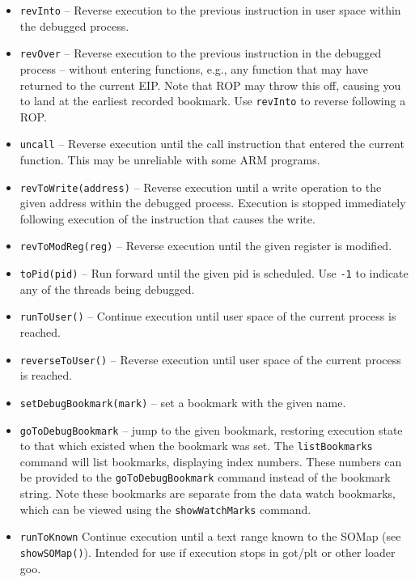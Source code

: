 \documentclass[titlepage]{article}
\begin{document}
\begin{itemize}
\item {\tt revInto} – Reverse execution to the previous instruction in user space within the debugged process. 

\item {\tt revOver} – Reverse execution to the previous instruction in the debugged process – without entering functions, e.g., any function that may have returned to the current EIP.  Note that ROP may throw this off, causing you to land at the earliest recorded bookmark.  Use {\tt revInto} to reverse following a ROP.

\item {\tt uncall} – Reverse execution until the call instruction that entered the current function.  This may be unreliable with some ARM
programs.

\item {\tt revToWrite(address)} – Reverse execution until a write operation to the given address within the debugged process. Execution is stopped immediately
following execution of the instruction that causes the write.

\item {\tt revToModReg(reg)} – Reverse execution until the given register is modified.


\item {\tt toPid(pid)} -- Run forward until the given pid is scheduled.  Use {\tt -1} to indicate any of the threads being debugged.

\item {\tt runToUser()} – Continue execution until user space of the current process is reached.

\item {\tt reverseToUser()} – Reverse execution until user space of the current process is reached.

\item {\tt setDebugBookmark(mark)} – set a bookmark with the given name.

\item {\tt goToDebugBookmark} – jump to the given bookmark, restoring execution state to that which existed when the bookmark was set.  The
{\tt listBookmarks} command will list bookmarks, displaying  index numbers.  These numbers can be provided to the {\tt goToDebugBookmark} command instead
of the bookmark string.  Note these bookmarks are separate from the data watch bookmarks, which can be viewed using the {\tt showWatchMarks} command.

\item {\tt runToKnown} Continue execution until a text range known to the SOMap (see {\tt showSOMap()}).  Intended for use if execution stops in got/plt 
or other loader goo.


\end{itemize}
\end{document}
